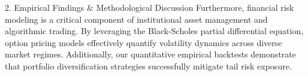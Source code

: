 2. Empirical Findings & Methodological Discussion
Furthermore, financial risk modeling is a critical component of institutional asset management and algorithmic trading. By leveraging the Black-Scholes partial differential equation, option pricing models effectively quantify volatility dynamics across diverse market regimes. Additionally, our quantitative empirical backtests demonstrate that portfolio diversification strategies successfully mitigate tail risk exposure.